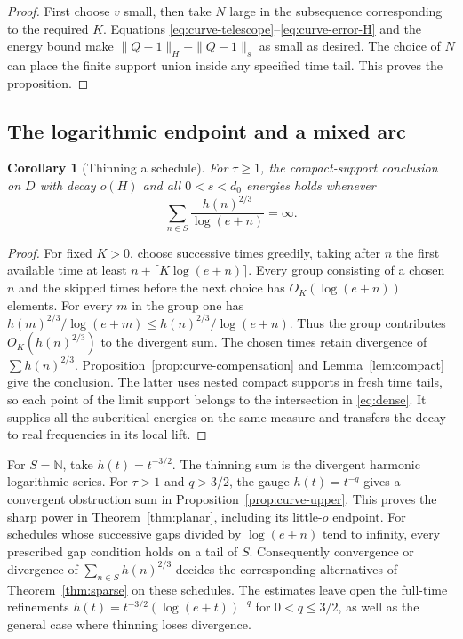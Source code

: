 \documentclass[11pt,a4paper,reqno]{amsart}
\newtheorem{corollary}[theorem]{Corollary}
\theoremstyle{definition}
\theoremstyle{remark}
\numberwithin{equation}{section}
\begin{document}
\begin{proof}
First choose \(v\) small, then take \(N\) large in the subsequence
corresponding to the required \(K\). Equations
\eqref{eq:curve-telescope}--\eqref{eq:curve-error-H} and the energy
bound make \(\|Q-1\|_H+\|Q-1\|_s\) as small as desired. The choice of
\(N\) can place the finite support union inside any specified time
tail. This proves the proposition.
\end{proof}

\subsection{The logarithmic endpoint and a mixed arc}
\begin{corollary}[Thinning a schedule]\label{cor:curve-log-gaps}
For \(\tau\ge1\), the compact-support conclusion on \(D\) with decay
\(o(H)\) and all \(0<s<d_0\) energies holds whenever
\[
                   \sum_{n\in S}\frac{h(n)^{2/3}}{\log(e+n)}=\infty .
\]
\end{corollary}
\begin{proof}
For fixed \(K>0\), choose successive times greedily, taking after \(n\)
the first available time at least \(n+\lceil K\log(e+n)\rceil\).
Every group consisting of a chosen \(n\) and the skipped times before
the next choice has \(O_K(\log(e+n))\) elements. For every \(m\) in the
group one has
\(h(m)^{2/3}/\log(e+m)\le h(n)^{2/3}/\log(e+n)\). Thus the group
contributes \(O_K(h(n)^{2/3})\) to the divergent sum. The chosen
times retain divergence of \(\sum h(n)^{2/3}\).
Proposition~\ref{prop:curve-compensation} and Lemma~\ref{lem:compact}
give the conclusion. The latter uses nested compact supports in fresh
time tails, so each point of the limit support belongs to the
intersection in \eqref{eq:dense}. It supplies all the subcritical
energies on the same measure and transfers the decay to real
frequencies in its local lift.
\end{proof}

For \(S=\mathbb N\), take \(h(t)=t^{-3/2}\). The thinning sum is
the divergent harmonic logarithmic series. For \(\tau>1\) and
\(q>3/2\), the gauge \(h(t)=t^{-q}\) gives a convergent obstruction
sum in Proposition~\ref{prop:curve-upper}. This proves the sharp
power in Theorem~\ref{thm:planar}, including its little-\(o\) endpoint.
For schedules whose successive gaps divided by \(\log(e+n)\) tend
to infinity, every prescribed gap condition holds on a tail of \(S\).
Consequently convergence or divergence of \(\sum_{n\in S}h(n)^{2/3}\)
decides the corresponding alternatives of Theorem~\ref{thm:sparse}
on these schedules. The estimates leave open the full-time
refinements \(h(t)=t^{-3/2}(\log(e+t))^{-q}\) for \(0<q\le3/2\),
as well as the general case where thinning loses divergence.
\end{document}
